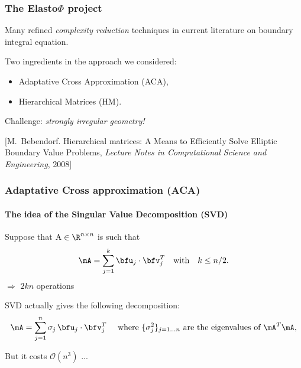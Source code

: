 \begin{frame}
\frametitle{The Elasto$\Phi$ project} 

Many refined \emph{complexity reduction} techniques in current literature on boundary integral equation.

\bigskip
Two ingredients in the approach we considered: 
\begin{itemize}
\item
Adaptative Cross Approximation (\alert{ACA}),
\item
Hierarchical Matrices (\alert{HM}).
\end{itemize}

\medskip
Challenge: \emph{strongly irregular geometry!}

\bigskip
\bigskip

{\tiny
[M.~Bebendorf. Hierarchical matrices: A Means to Efficiently Solve Elliptic Boundary Value Problems, {\em Lecture Notes in Computational Science and Engineering}, 2008]


\par} %

\end{frame}


\begin{frame}
\frametitle{Adaptative Cross approximation (ACA)}
\framesubtitle{The idea of the Singular Value Decomposition (SVD)} 
Suppose that $\mathrm{A} \in \R^{n\times n}$ is such that 
\[
\mA = \sum_{j=1}^{k}\bfu_{j}\cdot\bfv_{j}^{T}\quad \text{with}\quad k\leq n/2.
\]
$\Rightarrow$ $2kn$ operations

\bigskip
SVD actually gives the following decomposition:
\begin{equation*}\label{SVD}
\mA = \sum_{j=1}^{n}\sigma_{j}\,\bfu_{j}\cdot\bfv_{j}^{T}\quad \text{ where }\{\sigma_{j}^{2}\}_{j=1\dots n} \text{ are the eigenvalues of } \mA^{T}\mA,
\end{equation*}

But it costs $\mathcal{O}(n^{3})$ ...

\end{frame}

